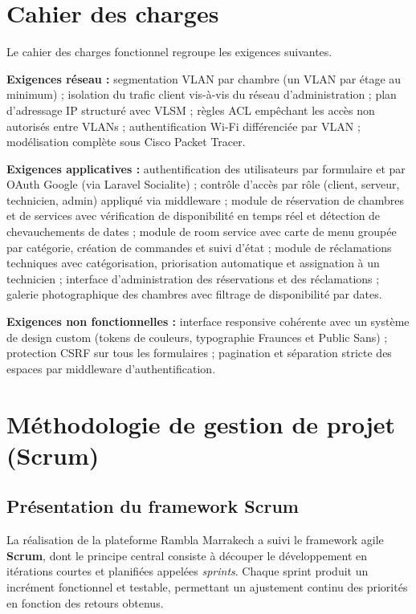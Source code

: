 \documentclass[12pt,a4paper]{report}
\begin{document}
\section{Cahier des charges}

Le cahier des charges fonctionnel regroupe les exigences suivantes.

\textbf{Exigences réseau :} segmentation VLAN par chambre (un VLAN par
étage au minimum) ; isolation du trafic client vis-à-vis du réseau
d'administration ; plan d'adressage IP structuré avec VLSM ; règles ACL
empêchant les accès non autorisés entre VLANs ; authentification Wi-Fi
différenciée par VLAN ; modélisation complète sous Cisco Packet Tracer.

\textbf{Exigences applicatives :} authentification des utilisateurs par
formulaire et par OAuth Google (via Laravel Socialite) ; contrôle d'accès
par rôle (client, serveur, technicien, admin) appliqué via middleware ;
module de réservation de chambres et de services avec vérification de
disponibilité en temps réel et détection de chevauchements de dates ;
module de room service avec carte de menu groupée par catégorie, création
de commandes et suivi d'état ; module de réclamations techniques avec
catégorisation, priorisation automatique et assignation à un technicien ;
interface d'administration des réservations et des réclamations ; galerie
photographique des chambres avec filtrage de disponibilité par dates.

\textbf{Exigences non fonctionnelles :} interface responsive cohérente avec
un système de design custom (tokens de couleurs, typographie Fraunces et
Public Sans) ; protection CSRF sur tous les formulaires ; pagination et
séparation stricte des espaces par middleware d'authentification.

\section{Méthodologie de gestion de projet (Scrum)}

\subsection{Présentation du framework Scrum}

La réalisation de la plateforme Rambla Marrakech a suivi le framework agile
\textbf{Scrum}, dont le principe central consiste à découper le développement
en itérations courtes et planifiées appelées \textit{sprints}. Chaque sprint
produit un incrément fonctionnel et testable, permettant un ajustement
continu des priorités en fonction des retours obtenus.
\end{document}
